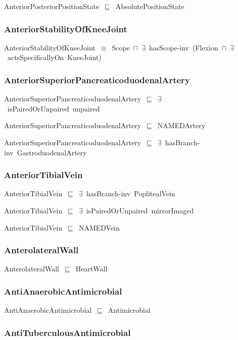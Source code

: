 \documentclass{article}
\begin{document}
AnteriorPosteriorPositionState~\ensuremath{\sqsubseteq}~AbsolutePositionState~

\subsubsection*{AnteriorStabilityOfKneeJoint}

AnteriorStabilityOfKneeJoint~\ensuremath{\equiv}~Scope~\ensuremath{\sqcap}~\ensuremath{\exists}~hasScope-inv~(Flexion~\ensuremath{\sqcap}~\ensuremath{\exists}~actsSpecificallyOn~KneeJoint)

\subsubsection*{AnteriorSuperiorPancreaticoduodenalArtery}

AnteriorSuperiorPancreaticoduodenalArtery~\ensuremath{\sqsubseteq}~\ensuremath{\exists}~isPairedOrUnpaired~unpaired~

AnteriorSuperiorPancreaticoduodenalArtery~\ensuremath{\sqsubseteq}~NAMEDArtery~

AnteriorSuperiorPancreaticoduodenalArtery~\ensuremath{\sqsubseteq}~\ensuremath{\exists}~hasBranch-inv~GastroduodenalArtery~

\subsubsection*{AnteriorTibialVein}

AnteriorTibialVein~\ensuremath{\sqsubseteq}~\ensuremath{\exists}~hasBranch-inv~PoplitealVein~

AnteriorTibialVein~\ensuremath{\sqsubseteq}~\ensuremath{\exists}~isPairedOrUnpaired~mirrorImaged~

AnteriorTibialVein~\ensuremath{\sqsubseteq}~NAMEDVein~

\subsubsection*{AnterolateralWall}

AnterolateralWall~\ensuremath{\sqsubseteq}~HeartWall~

\subsubsection*{AntiAnaerobicAntimicrobial}

AntiAnaerobicAntimicrobial~\ensuremath{\sqsubseteq}~Antimicrobial~

\subsubsection*{AntiTuberculousAntimicrobial}
\end{document}
